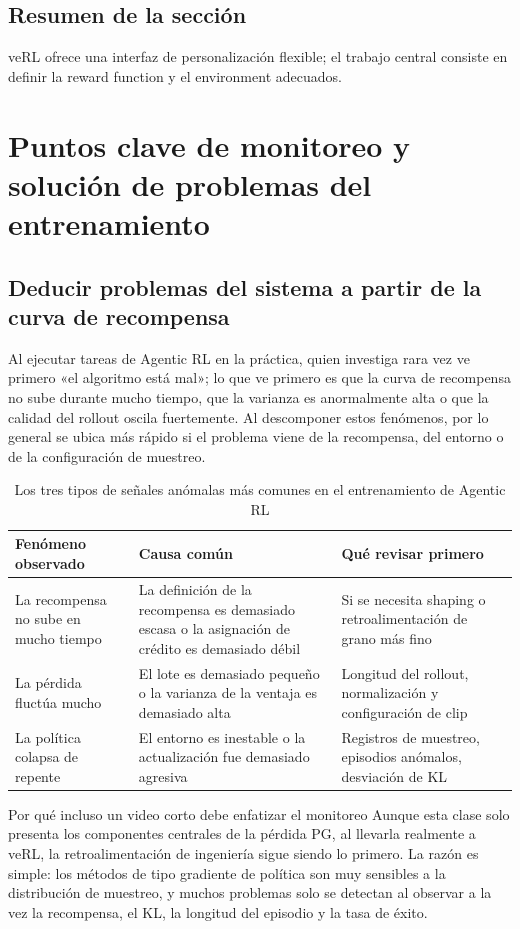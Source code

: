 \documentclass[a4paper]{article}
\begin{document}
\subsection{Resumen de la sección}
veRL ofrece una interfaz de personalización flexible; el trabajo central consiste en definir la reward function y el environment adecuados.

\section{Puntos clave de monitoreo y solución de problemas del entrenamiento}
\subsection{Deducir problemas del sistema a partir de la curva de recompensa}
Al ejecutar tareas de Agentic RL en la práctica, quien investiga rara vez ve primero «el algoritmo está mal»; lo que ve primero es que la curva de recompensa no sube durante mucho tiempo, que la varianza es anormalmente alta o que la calidad del rollout oscila fuertemente. Al descomponer estos fenómenos, por lo general se ubica más rápido si el problema viene de la recompensa, del entorno o de la configuración de muestreo.

\begin{table}[H]
\centering
\begin{tabular}{p{3.5cm}p{5cm}p{4.5cm}}
\toprule
Fenómeno observado & Causa común & Qué revisar primero \\
\midrule
La recompensa no sube en mucho tiempo & La definición de la recompensa es demasiado escasa o la asignación de crédito es demasiado débil & Si se necesita shaping o retroalimentación de grano más fino \\
La pérdida fluctúa mucho & El lote es demasiado pequeño o la varianza de la ventaja es demasiado alta & Longitud del rollout, normalización y configuración de clip \\
La política colapsa de repente & El entorno es inestable o la actualización fue demasiado agresiva & Registros de muestreo, episodios anómalos, desviación de KL \\
\bottomrule
\end{tabular}
\caption{Los tres tipos de señales anómalas más comunes en el entrenamiento de Agentic RL}
\end{table}

\begin{knowledgebox}{Por qué incluso un video corto debe enfatizar el monitoreo}
Aunque esta clase solo presenta los componentes centrales de la pérdida PG, al llevarla realmente a veRL, la retroalimentación de ingeniería sigue siendo lo primero. La razón es simple: los métodos de tipo gradiente de política son muy sensibles a la distribución de muestreo, y muchos problemas solo se detectan al observar a la vez la recompensa, el KL, la longitud del episodio y la tasa de éxito.
\end{knowledgebox}
\end{document}
